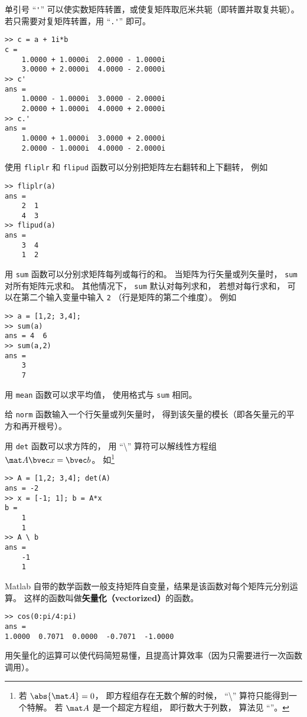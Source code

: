 单引号 “\verb|'|” 可以使实数矩阵转置，或使复矩阵取厄米共轭（即转置并取复共轭）。若只需要对复矩阵转置，用 “\verb|.'|” 即可。
\begin{lstlisting}[language=matlabC]
>> c = a + 1i*b
c =
    1.0000 + 1.0000i  2.0000 - 1.0000i
    3.0000 + 2.0000i  4.0000 - 2.0000i
>> c'
ans =
    1.0000 - 1.0000i  3.0000 - 2.0000i
    2.0000 + 1.0000i  4.0000 + 2.0000i
>> c.'
ans =
    1.0000 + 1.0000i  3.0000 + 2.0000i
    2.0000 - 1.0000i  4.0000 - 2.0000i
\end{lstlisting}
使用 \verb|fliplr| 和 \verb|flipud| 函数可以分别把矩阵左右翻转和上下翻转， 例如
\begin{lstlisting}[language=matlabC]
>> fliplr(a)
ans =
    2  1
    4  3
>> flipud(a)
ans =
    3  4
    1  2
\end{lstlisting}

用 \verb|sum| 函数可以分别求矩阵每列或每行的和。 当矩阵为行矢量或列矢量时， \verb|sum| 对所有矩阵元求和。 其他情况下， \verb|sum| 默认对每列求和， 若想对每行求和， 可以在第二个输入变量中输入 \verb|2| （行是矩阵的第二个维度）。 例如
\begin{lstlisting}[language=matlabC]
>> a = [1,2; 3,4];
>> sum(a)
ans = 4  6
>> sum(a,2)
ans =
    3
    7
\end{lstlisting}
用 \verb|mean| 函数可以求平均值， 使用格式与 \verb|sum| 相同。

给 \verb|norm| 函数输入一个行矢量或列矢量时， 得到该矢量的模长（即各矢量元的平方和再开根号）。 

用 \verb|det| 函数可以求方阵的， 用 “\textbackslash” 算符可以解线性方程组%
 $\mat A \bvec x = \bvec b$。 如\footnote{若 $\abs{\mat A} = 0$， 即方程组存在无数个解的时候， “\textbackslash” 算符只能得到一个特解。 若 $\mat A$ 是一个超定方程组， 即行数大于列数， 算法见 “”。}
\begin{lstlisting}[language=matlabC]
>> A = [1,2; 3,4]; det(A)
ans = -2
>> x = [-1; 1]; b = A*x
b =
    1
    1
>> A \ b
ans =
    -1
    1
\end{lstlisting}

Matlab 自带的数学函数一般支持矩阵自变量，结果是该函数对每个矩阵元分别运算。 这样的函数叫做\textbf{矢量化（vectorized）}的函数。
\begin{lstlisting}[language=matlabC]
>> cos(0:pi/4:pi)
ans =
1.0000  0.7071  0.0000  -0.7071  -1.0000
\end{lstlisting}
用矢量化的运算可以使代码简短易懂，且提高计算效率（因为只需要进行一次函数调用）。

